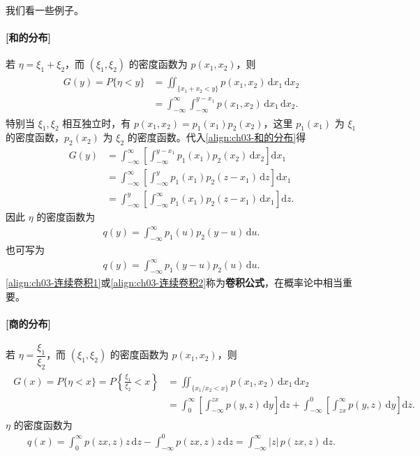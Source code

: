 \documentclass[../../main.tex]{subfiles}
\begin{document}
我们看一些例子。

\paragraph{[和的分布]}若 $\eta=\xi_1+\xi_2$，而 $(\xi_1,\xi_2)$ 的密度函数为 $p(x_1,x_2)$，则
\begin{align}
\begin{aligned}
G(y)=P\{\eta<y\}&=\iint_{\{x_1+x_2<y\}}p(x_1,x_2)\,\mathrm{d}x_1\,\mathrm{d}x_2\\
&=\int_{-\infty}^{\infty}\int_{-\infty}^{y-x_1}p(x_1,x_2)\,\mathrm{d}x_1\,\mathrm{d}x_2.
\end{aligned}\label{align:ch03-和的分布}
\end{align}
特别当 $\xi_1,\xi_2$ 相互独立时，有 $p(x_1,x_2)=p_1(x_1)p_2(x_2)$，这里 $p_1(x_1)$ 为 $\xi_1$ 的密度函数，$p_2(x_2)$ 为 $\xi_2$ 的密度函数。代入\eqref{align:ch03-和的分布}得
\begin{align*}
G(y)&=\int_{-\infty}^{\infty}\left[\int_{-\infty}^{y-x_1}p_1(x_1)p_2(x_2)\,\mathrm{d}x_2\right]\mathrm{d}x_1\\
&=\int_{-\infty}^{\infty}\left[\int_{-\infty}^{y}p_1(x_1)p_2(z-x_1)\,\mathrm{d}z\right]\mathrm{d}x_1\\
&=\int_{-\infty}^{y}\left[\int_{-\infty}^{\infty}p_1(x_1)p_2(z-x_1)\,\mathrm{d}x_1\right]\mathrm{d}z.
\end{align*}
因此 $\eta$ 的密度函数为
\begin{align}
q(y)=\int_{-\infty}^{\infty}p_1(u)p_2(y-u)\,\mathrm{d}u.\label{align:ch03-连续卷积1}
\end{align}
也可写为
\begin{align}
q(y)=\int_{-\infty}^{\infty}p_1(y-u)p_2(u)\,\mathrm{d}u.\label{align:ch03-连续卷积2}
\end{align}
\eqref{align:ch03-连续卷积1}或\eqref{align:ch03-连续卷积2}称为\textbf{卷积公式}，在概率论中相当重要。

\paragraph{[商的分布]}若 $\eta=\dfrac{\xi_1}{\xi_2}$，而 $(\xi_1,\xi_2)$ 的密度函数为 $p(x_1,x_2)$，则
\begin{align}
\begin{aligned}
G(x)=P\{\eta<x\}=P\left\{\frac{\xi_1}{\xi_2}<x\right\}
&=\iint_{\{x_1/x_2<x\}}p(x_1,x_2)\,\mathrm{d}x_1\,\mathrm{d}x_2\\
&=\int_{0}^{\infty}\left[\int_{-\infty}^{zx}p(y,z)\,\mathrm{d}y\right]\mathrm{d}z+\int_{-\infty}^{0}\left[\int_{zx}^{\infty}p(y,z)\,\mathrm{d}y\right]\mathrm{d}z.
\end{aligned}\label{align:ch03-商的分布}
\end{align}
$\eta$ 的密度函数为
\begin{align}
q(x)=\int_{0}^{\infty}p(zx,z)z\,\mathrm{d}z-\int_{-\infty}^{0}p(zx,z)z\,\mathrm{d}z
=\int_{-\infty}^{\infty}|z|\,p(zx,z)\,\mathrm{d}z.\label{align:ch03-商的密度}
\end{align}
\end{document}
